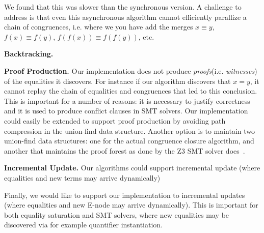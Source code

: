 We found that this was slower than the synchronous version. A challenge to
address is that even this asynchronous algorithm cannot efficiently parallize a
chain of congruences, i.e. where we you have add the merges $x \equiv y$, $f(x)
\equiv f(y)$, $f(f(x)) \equiv f(f(y))$, etc.




\textbf{Backtracking.} 

\textbf{Proof Production.} Our implementation does not produce \emph{proofs}(i.e.
\emph{witnesses}) of the equalities it discovers. For instance if our algorithm
discovers that $x = y$, it cannot replay the chain of equalities and congruences
that led to this conclusion. This is important for a number of reasons: it is
necessary to justify correctness and it is used to produce conflict clauses in
SMT solvers. Our implementation could easily be extended to support proof
production by avoiding path compression in the union-find data structure.
Another option is to maintain two union-find data structures: one for the actual
congruence closure algorithm, and another that maintains the proof forest as
done by the Z3 SMT solver does~\cite{z3-internals}.

\textbf{Incremental Update.} Our algorithms could support incremental update
(where equalities and new terms may arrive dynamically)

Finally, we would like to support our
implementation to incremental updates (where equalities and new E-node may
arrive dynamically). This is important for both equality saturation and SMT
solvers, where new equalities may be discovered via for example quantifier
instantiation.
